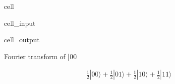 \documentclass[letterpaper,10pt,english]{jupyterBook}
\begin{document}
\begin{sphinxuseclass}{cell}\begin{sphinxVerbatimInput}

\begin{sphinxuseclass}{cell_input}
\begin{sphinxVerbatim}[commandchars=\\\{\}]


   
\end{sphinxVerbatim}

\end{sphinxuseclass}\end{sphinxVerbatimInput}
\begin{sphinxVerbatimOutput}

\begin{sphinxuseclass}{cell_output}
\begin{sphinxVerbatim}[commandchars=\\\{\}]
Fourier transform of |00\PYGZgt{}
\end{sphinxVerbatim}
\begin{equation*}
\begin{split}\frac{1}{2} |00\rangle+\frac{1}{2} |01\rangle+\frac{1}{2} |10\rangle+\frac{1}{2} |11\rangle\end{split}
\end{equation*}
\end{sphinxuseclass}\end{sphinxVerbatimOutput}

\end{sphinxuseclass}
\end{document}
